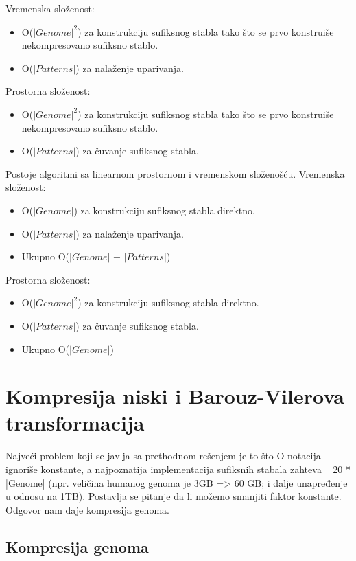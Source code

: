 Vremenska složenost: 
\begin{itemize}
\item O($|Genome|^2$) za konstrukciju sufiksnog stabla tako što se prvo konstruiše nekompresovano sufiksno stablo.
\item O($|Patterns|$) za nalaženje uparivanja.
\end{itemize}
Prostorna složenost:
\begin{itemize}
\item O($|Genome|^2$) za konstrukciju sufiksnog stabla tako što se prvo konstruiše nekompresovano sufiksno stablo.
\item O($|Patterns|$) za čuvanje sufiksnog stabla.
\end{itemize}




Postoje algoritmi sa linearnom prostornom i vremenskom složenošću.
Vremenska složenost: 
\begin{itemize}
\item O($|Genome|$) za konstrukciju sufiksnog stabla direktno.
\item O($|Patterns|$) za nalaženje uparivanja.
\item Ukupno O($|Genome|$ + $|Patterns|$)
\end{itemize}
Prostorna složenost:
\begin{itemize}
\item O($|Genome|^2$) za konstrukciju sufiksnog stabla direktno.
\item O($|Patterns|$) za čuvanje sufiksnog stabla.
\item Ukupno O($|Genome|$)
\end{itemize}

\section{Kompresija niski i Barouz-Vilerova transformacija}

Najveći problem koji se javlja sa prethodnom rešenjem je to što O-notacija ignoriše konstante, a najpoznatija implementacija sufiksnih stabala zahteva ~ 20 * |Genome| (npr. veličina humanog genoma je 3GB => 60 GB; i dalje unapređenje u odnosu na 1TB). Postavlja se pitanje da li možemo smanjiti faktor konstante. Odgovor nam daje kompresija genoma.

\subsection{Kompresija genoma}

